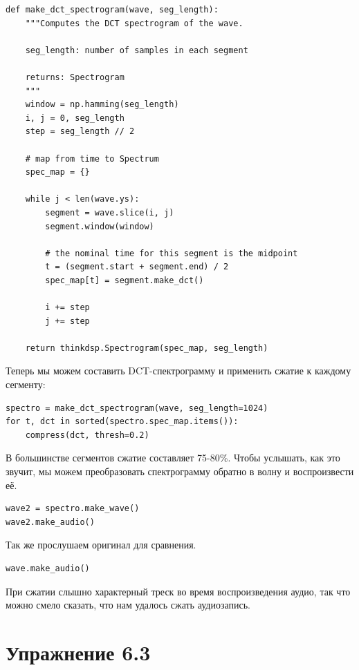 \documentclass[a4paper,12pt]{report}
\begin{document}
\begin{lstlisting}[caption=Функция \texttt{make\_dct\_spectrogram}]
def make_dct_spectrogram(wave, seg_length):
    """Computes the DCT spectrogram of the wave.

    seg_length: number of samples in each segment

    returns: Spectrogram
    """
    window = np.hamming(seg_length)
    i, j = 0, seg_length
    step = seg_length // 2

    # map from time to Spectrum
    spec_map = {}

    while j < len(wave.ys):
        segment = wave.slice(i, j)
        segment.window(window)

        # the nominal time for this segment is the midpoint
        t = (segment.start + segment.end) / 2
        spec_map[t] = segment.make_dct()

        i += step
        j += step

    return thinkdsp.Spectrogram(spec_map, seg_length)
\end{lstlisting}

Теперь мы можем составить DCT-спектрограмму и применить сжатие к каждому сегменту:

\begin{lstlisting}[caption=Сжатие звука]
spectro = make_dct_spectrogram(wave, seg_length=1024)
for t, dct in sorted(spectro.spec_map.items()):
    compress(dct, thresh=0.2)
\end{lstlisting}

В большинстве сегментов сжатие составляет 75-80\%. Чтобы услышать, как это звучит, мы можем преобразовать спектрограмму обратно в волну и воспроизвести её.

\begin{lstlisting}[caption=Воспроизведение сжатого звука]
wave2 = spectro.make_wave()
wave2.make_audio()
\end{lstlisting}

Так же прослушаем оригинал для сравнения.

\begin{lstlisting}[caption=Воспроизведение оригинального звука]
wave.make_audio()
\end{lstlisting}

При сжатии слышно характерный треск во время воспроизведения аудио, так что можно смело сказать, что нам удалось сжать аудиозапись.

\chapter{Упражнение 6.3}
\end{document}

